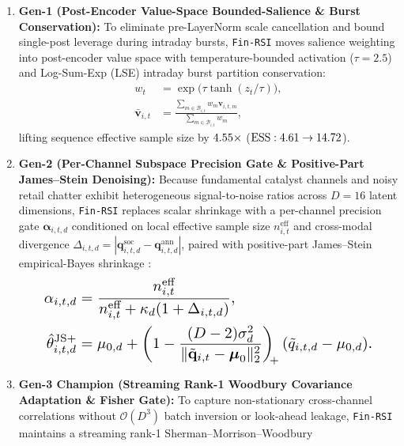 \begin{enumerate}
\item \textbf{Gen-1 (Post-Encoder Value-Space Bounded-Salience \& Burst Conservation):}
To eliminate pre-LayerNorm scale cancellation and bound single-post leverage during intraday
bursts, \texttt{Fin-RSI} moves salience weighting into post-encoder value space with temperature-bounded
activation ($\tau = 2.5$) and Log-Sum-Exp (LSE) intraday burst partition conservation:
\begin{equation}
\begin{aligned}
w_t &= \exp\!\bigl(\tau \tanh(z_t / \tau)\bigr), \\
\bar{\mathbf{v}}_{i,t} &= \frac{\sum_{m \in \mathcal{B}_{i,t}} w_m \mathbf{v}_{i,t,m}}{\sum_{m \in \mathcal{B}_{i,t}} w_m},
\end{aligned}
\end{equation}
lifting sequence effective sample size by $4.55{}\times$ ($\operatorname{ESS}: 4.61{} \to 14.72{}$).
\item \textbf{Gen-2 (Per-Channel Subspace Precision Gate \& Positive-Part James--Stein Denoising):}
Because fundamental catalyst channels and noisy retail chatter exhibit heterogeneous signal-to-noise
ratios across $D=16$ latent dimensions, \texttt{Fin-RSI} replaces scalar shrinkage with a per-channel
precision gate $\boldsymbol{\alpha}_{i,t,d}$ conditioned on local effective sample size $n_{i,t}^{\text{eff}}$
and cross-modal divergence $\Delta_{i,t,d} = |\mathbf{q}_{i,t,d}^{\text{soc}} - \mathbf{q}_{i,t,d}^{\text{ann}}|$, paired
with positive-part James--Stein empirical-Bayes shrinkage \cite{james1961estimation}:
\begin{equation}
\resizebox{0.86\columnwidth}{!}{$\displaystyle
\begin{aligned}
\alpha_{i,t,d} &= \frac{n_{i,t}^{\text{eff}}}{n_{i,t}^{\text{eff}} + \kappa_d (1 + \Delta_{i,t,d})}, \\
\hat{\theta}_{i,t,d}^{\text{JS}+} &= \mu_{0,d} + \left(1 - \frac{(D-2)\sigma_d^2}{\|\tilde{\mathbf{q}}_{i,t} - \boldsymbol{\mu}_0\|_2^2}\right)_{\!\!+}(\tilde{q}_{i,t,d} - \mu_{0,d}).
\end{aligned}
$}
\end{equation}
\item \textbf{Gen-3 Champion (Streaming Rank-1 Woodbury Covariance Adaptation \& Fisher Gate):}
To capture non-stationary cross-channel correlations without $\mathcal{O}(D^3)$ batch inversion or
look-ahead leakage, \texttt{Fin-RSI} maintains a streaming rank-1 Sherman--Morrison--Woodbury

\end{enumerate}
